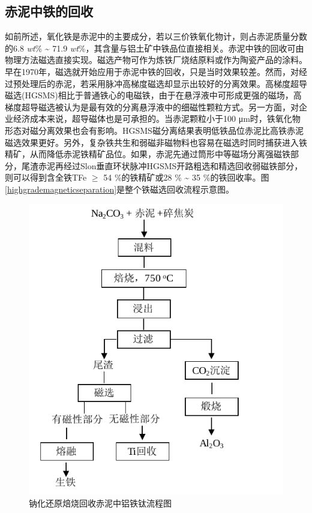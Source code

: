\subsection{赤泥中铁的回收}
如前所述，氧化铁是赤泥中的主要成分，若以三价铁氧化物计，则占赤泥质量分数的6.8 \textit{wt}\% \textasciitilde{ }71.9 \textit{wt}\%，其含量与铝土矿中铁品位直接相关\cite{grafe2011bauxite,jayasankar2012production}。赤泥中铁的回收可由物理方法磁选直接实现。磁选产物可作为炼铁厂烧结原料或作为陶瓷产品的涂料\cite{hammond2013cr,jamieson2006magnetic}。早在1970年，磁选就开始应用于赤泥中铁的回收，只是当时效果较差\cite{liu2015metallurgical}。然而，对经过预处理后的赤泥，若采用脉冲高梯度磁选却显示出较好的分离效果\cite{li2005study}。高梯度超导磁选(HGSMS)相比于普通铁心的电磁铁，由于在悬浮液中可形成更强的磁场，高梯度超导磁选被认为是最有效的分离悬浮液中的细磁性颗粒方式。另一方面，对企业经济成本来说，超导磁体也是可承担的\cite{ohara2001magnetic}。当赤泥颗粒小于100 μm时，铁氧化物形态对磁分离效果也会有影响\cite{li2011feasibility}。HGSMS磁分离结果表明低铁品位赤泥比高铁赤泥磁选效果更好。另外，复杂铁共生和弱磁非磁物料也容易在磁选时同时捕获进入铁精矿，从而降低赤泥铁精矿品位。如果，赤泥先通过筒形中等磁场分离强磁铁部分，尾渣赤泥再经过Slon\textregistered 垂直环状脉冲HGSMS开路粗选和精选回收弱磁铁部分，则可以得到含全铁TFe $ \geq $ 54 \%的铁精矿或28 \% \textasciitilde{ }35 \%的铁回收率\cite{peng2011method}。图\ref{highgrademagneticseparation}是整个铁磁选回收流程示意图。
\begin{figure}[!h]
	\centering
	\setlength{\belowcaptionskip}{6pt plus0.3ex minus 0.06ex}
	\includegraphics[width=0.65\linewidth]{Figures/c1/Figure6}
	\caption{钠化还原焙烧回收赤泥中铝铁钛流程图}\label{recoveringFe, Al, Ti}
\end{figure}

